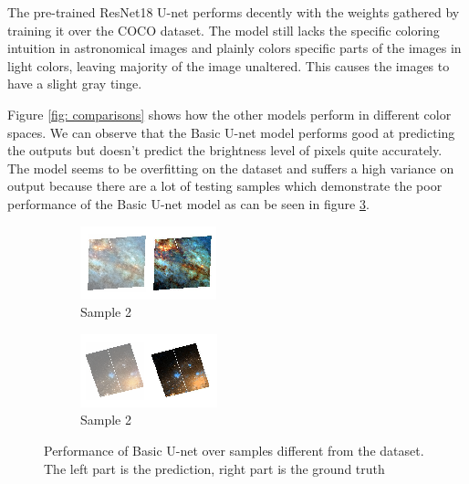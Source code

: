 \documentclass[conference]{IEEEtran}
\begin{document}
The pre-trained ResNet18 U-net performs decently with the weights gathered by training it over the COCO dataset. The model still lacks the specific coloring intuition in astronomical images and plainly colors specific parts of the images in light colors, leaving majority of the image unaltered. This causes the images to have a slight gray tinge.

Figure \ref{fig: comparisons} shows how the other models perform in different color spaces. We can observe that the Basic U-net model performs good at predicting the outputs but doesn't predict the brightness level of pixels quite accurately. The model seems to be overfitting on the dataset and suffers a high variance on output because there are a lot of testing samples which demonstrate the poor performance of the Basic U-net model as can be seen in figure \ref{fig: u-net_overfit}.
\begin{figure}[!htb]
	\centering
	\begin{subfigure}[b]{0.2\textwidth}
		\centering
		\includegraphics[width=\textwidth]{figures/overfit_1}
		\caption{Sample 2}
		\label{fig: overfit1}
	\end{subfigure}
		\hspace{0.1 in}
	\begin{subfigure}[b]{0.2\textwidth}
		\centering
		\includegraphics[width=\textwidth]{figures/overfit_2}
		\caption{Sample 2}
		\label{fig: overfit2}
	\end{subfigure}
	\caption{Performance of Basic U-net over samples different from the dataset. The left part is the prediction, right part is the ground truth}
	\label{fig: u-net_overfit}
\end{figure}
\end{document}
